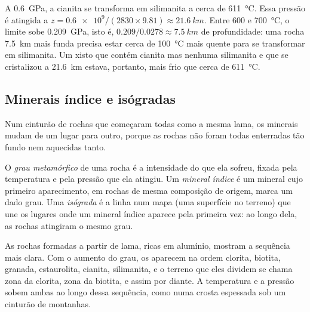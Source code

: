 \begin{example}\label{ex:g12:metamorphic-rocks:kysil}
A \qty{0.6}{GPa}, a cianita se transforma em silimanita a cerca de
\qty{611}{\celsius}. Essa pressão é atingida a $z = \num{0.6e9} / (2830
\times 9.81) \approx \qty{21.6}{km}$. Entre 600 e \qty{700}{\celsius}, o
limite sobe \qty{0.209}{GPa}, isto é, $0.209/0.0278 \approx
\qty{7.5}{km}$ de profundidade: uma rocha \qty{7.5}{km} mais funda precisa
estar cerca de \qty{100}{\celsius} mais quente para se transformar em
silimanita. Um xisto que contém cianita mas nenhuma silimanita e que se
cristalizou a \qty{21.6}{km} estava, portanto, mais frio que cerca de
\qty{611}{\celsius}.
\end{example}

\subsection{Minerais índice e isógradas}

Num cinturão de rochas que começaram todas como a mesma lama, os minerais
mudam de um lugar para outro, porque as rochas não foram todas enterradas
tão fundo nem aquecidas tanto.

\begin{definition}\label{def:g12:metamorphic-rocks:index-mineral}
O \emph{grau metamórfico} de uma rocha é a
intensidade do  que ela sofreu, fixada pela temperatura e pela
pressão que ela atingiu. Um \emph{mineral índice} é um
mineral cujo primeiro aparecimento, em rochas de mesma composição de
origem, marca um dado grau. Uma \emph{isógrada} é a linha num mapa
(uma superfície no terreno) que une os lugares onde um mineral índice
aparece pela primeira vez: ao longo dela, as rochas atingiram o mesmo grau.
\end{definition}

As rochas formadas a partir de lama, ricas em alumínio, mostram a sequência
mais clara. Com o aumento do grau, os  aparecem na ordem
clorita, biotita, granada, estaurolita, cianita, silimanita, e o terreno
que eles dividem se chama zona da clorita, zona da biotita, e assim por
diante. A temperatura e a pressão sobem ambas ao longo dessa sequência, como
numa crosta espessada sob um cinturão de montanhas.

